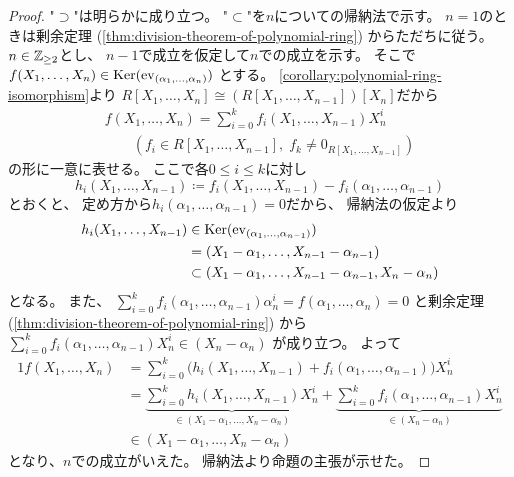 \documentclass[report]{jlreq}
\begin{document}
\begin{proof}
    "$\supset$"は明らかに成り立つ。
    "$\subset$"を$n$についての帰納法で示す。
    $n = 1$のときは剰余定理
    (\cref{thm:division-theorem-of-polynomial-ring})
    からただちに従う。
    $n \in \mathbb{Z}_{\ge 2}$とし、
    $n - 1$で成立を仮定して$n$での成立を示す。
    そこで
    $f(X_1, \dots, X_n) \in \operatorname{\mathrm{Ker}}(\mathrm{ev}_{(\alpha_1, \dots, \alpha_n)})$
    とする。
    \cref{corollary:polynomial-ring-isomorphism}より
    $R[X_1, \dots, X_n] \cong (R[X_1, \dots, X_{n - 1}])[X_n]$だから
    \begin{align}
        f(X_1, \dots, X_n)
            = \sum_{i = 0}^k f_i(X_1, \dots, X_{n - 1}) X_n^i \\
        \qquad (
            f_i \in R[X_1, \dots, X_{n - 1}], \;
            f_k \neq 0_{R[X_1, \dots, X_{n - 1}]}
        )
    \end{align}
    の形に一意に表せる。
    ここで各$0 \le i \le k$に対し
    \begin{equation}
        h_i(X_1, \dots, X_{n - 1})
            \coloneqq f_i(X_1, \dots, X_{n - 1})
            - f_i(\alpha_1, \dots, \alpha_{n - 1})
    \end{equation}
    とおくと、
    定め方から$h_i(\alpha_1, \dots, \alpha_{n - 1}) = 0$だから、
    帰納法の仮定より
    \begin{alignat}{1}
        h_i(X_1, \dots, X_{n - 1})
            &\in \operatorname{\mathrm{Ker}}(\mathrm{ev}_{(\alpha_1, \dots, \alpha_{n - 1})}) \\
            &= (X_1 - \alpha_1, \dots, X_{n - 1} - \alpha_{n - 1}) \\
            &\subset
                (X_1 - \alpha_1, \dots, X_{n - 1} - \alpha_{n - 1}, X_n - \alpha_n)
    \end{alignat}
    となる。
    また、
    $\sum_{i = 0}^k
        f_i(\alpha_1, \dots, \alpha_{n - 1})
        \alpha_n^i
        = f(\alpha_1, \dots, \alpha_n)
        = 0$
    と剰余定理
    (\cref{thm:division-theorem-of-polynomial-ring})
    から
    $\sum_{i = 0}^k
        f_i(\alpha_1, \dots, \alpha_{n - 1})
        X_n^i
        \in (X_n - \alpha_n)$
    が成り立つ。
    よって
    \begin{alignat}{1}
        f(X_1, \dots, X_n)
            &= \sum_{i = 0}^k
                \bigl(
                    h_i(X_1, \dots, X_{n - 1})
                    + f_i(\alpha_1, \dots, \alpha_{n - 1})
                \bigr)
                X_n^i \\
            &= \underbrace{
                    \sum_{i = 0}^k
                    h_i(X_1, \dots, X_{n - 1})
                    X_n^i
                }_{\in (X_1 - \alpha_1, \dots, X_n - \alpha_n)}
                + \underbrace{
                    \sum_{i = 0}^k
                    f_i(\alpha_1, \dots, \alpha_{n - 1})
                    X_n^i
                }_{\in (X_n - \alpha_n)} \\
            &\in (X_1 - \alpha_1, \dots, X_n - \alpha_n)
    \end{alignat}
    となり、$n$での成立がいえた。
    帰納法より命題の主張が示せた。
\end{proof}
\end{document}
